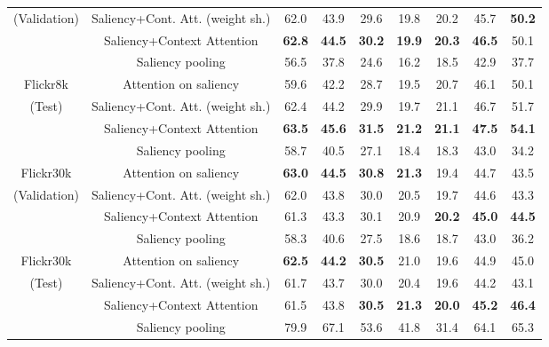 \begin{table}[t]
\begin{center}
\begin{small}
\begin{tabular}{|c|c|ccccccc|}
     \footnotesize{(Validation)} &  \footnotesize{Saliency+Cont. Att. (weight sh.)}  & 62.0 & 43.9 & 29.6 &	19.8 & 20.2 &	45.7 &	\textbf{50.2} \\ 
     & \footnotesize{Saliency+Context Attention} & \textbf{62.8} & \textbf{44.5}  & \textbf{30.2} & \textbf{19.9} & \textbf{20.3} & \textbf{46.5} & 50.1  \\ \hline 
     &  \footnotesize{Saliency pooling}  & 56.5 & 37.8 & 24.6 &	16.2 &	18.5 &	42.9 &	37.7 \\ 
   \footnotesize{Flickr8k} &  \footnotesize{Attention on saliency}  & 59.6 & 42.2 & 28.7 & 19.5 & 20.7 & 46.1 & 50.1 \\
    \footnotesize{(Test)} &  \footnotesize{Saliency+Cont. Att. (weight sh.)}  & 62.4 & 44.2 & 29.9 & 19.7 &	21.1 & 46.7 & 51.7 \\ 
      & \footnotesize{Saliency+Context Attention} & \textbf{63.5} &	\textbf{45.6}  & \textbf{31.5} & \textbf{21.2} &  \textbf{21.1}  & \textbf{47.5} & \textbf{54.1}  \\ \hline
     &  \footnotesize{Saliency pooling}  & 58.7 & 40.5 & 27.1 &	18.4 & 18.3 & 43.0 & 34.2 \\  
     \footnotesize{Flickr30k} &  \footnotesize{Attention on saliency} & \textbf{63.0} & \textbf{44.5} & \textbf{30.8} & \textbf{21.3} & 19.4 & 44.7 & 43.5 \\ 
     \footnotesize{(Validation)} &  \footnotesize{Saliency+Cont. Att. (weight sh.)}  & 62.0 & 43.8 & 30.0 & 20.5 & 19.7 & 44.6 & 43.3 \\ 
     & \footnotesize{Saliency+Context Attention} & 61.3  & 43.3  & 30.1  & 20.9 & \textbf{20.2} & \textbf{45.0} & \textbf{44.5} \\ \hline 
    &  \footnotesize{Saliency pooling}  & 58.3 & 40.6 & 27.5 & 18.6 & 18.7 & 43.0 &	36.2 \\ 
    \footnotesize{Flickr30k}  &  \footnotesize{Attention on saliency}  & \textbf{62.5} & \textbf{44.2} & \textbf{30.5} & 21.0 & 19.6 & 44.9 &	45.0 \\ 
    \footnotesize{(Test)} &  \footnotesize{Saliency+Cont. Att. (weight sh.)} & 61.7 & 43.7 & 30.0 & 20.4 & 19.6 & 44.2 & 43.1 \\ 
      & \footnotesize{Saliency+Context Attention} & 61.5 &	43.8  & \textbf{30.5} & \textbf{21.3} & \textbf{20.0}  & \textbf{45.2} & \textbf{46.4} \\ \hline
      \footnotesize{\multirow{4}{*}{PASCAL-50S}} 
    & \footnotesize{Saliency pooling} & 79.9 & 67.1 & 53.6 & 41.8 & 31.4 & 64.1 & 65.3 \\ 

\end{tabular}
\end{small}
\end{center}
\end{table}
